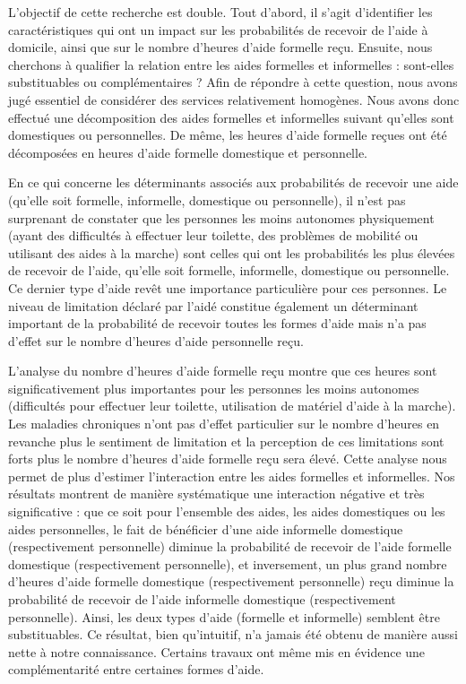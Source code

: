 \begin{Article}
\begin{refsection}[Bonnal]
L'objectif de cette recherche est double. Tout d'abord, il s'agit d'identifier les caractéristiques qui ont un impact sur les probabilités de recevoir de l'aide à domicile, ainsi que sur le nombre d'heures d'aide formelle reçu. Ensuite, nous cherchons à qualifier la relation entre les aides formelles et informelles : sont-elles substituables ou complémentaires ? Afin de répondre à cette question, nous avons jugé essentiel de considérer des services relativement homogènes. Nous avons donc effectué une décomposition des aides formelles et informelles suivant qu'elles sont domestiques ou personnelles. De même, les heures d'aide formelle reçues ont été décomposées en heures d'aide formelle domestique et personnelle.

En ce qui concerne les déterminants associés aux probabilités de recevoir une aide (qu'elle soit formelle, informelle, domestique ou personnelle), il n'est pas surprenant de constater que les personnes les moins autonomes physiquement (ayant des difficultés à effectuer leur toilette, des problèmes de mobilité ou utilisant des aides à la marche) sont celles qui ont les probabilités les plus élevées de recevoir de l'aide, qu'elle soit formelle, informelle, domestique ou personnelle. Ce dernier type d'aide revêt une importance particulière pour ces personnes. Le niveau de limitation déclaré par l'aidé constitue également un déterminant important de la probabilité de recevoir toutes les formes d'aide mais n'a pas d'effet sur le nombre d'heures d'aide personnelle reçu.

L’analyse du nombre d’heures d’aide formelle reçu montre que ces heures sont significativement plus importantes pour les personnes les moins autonomes (difficultés pour effectuer leur toilette, utilisation de matériel d’aide à la marche). Les maladies chroniques n’ont pas d’effet particulier sur le nombre d’heures en revanche plus le sentiment de limitation et la perception de ces limitations sont forts plus le nombre d’heures d’aide formelle reçu sera élevé. Cette analyse nous permet de plus d'estimer l'interaction entre les aides formelles et informelles. Nos résultats montrent de manière systématique une interaction négative et très significative : que ce soit pour l'ensemble des aides, les aides domestiques ou les aides personnelles, le fait de bénéficier d'une aide informelle domestique (respectivement personnelle) diminue la probabilité de recevoir de l'aide formelle domestique (respectivement personnelle), et inversement, un plus grand nombre d'heures d'aide formelle domestique (respectivement personnelle) reçu diminue la probabilité de recevoir de l'aide informelle domestique (respectivement personnelle). Ainsi, les deux types d'aide (formelle et informelle) semblent être substituables. Ce résultat, bien qu'intuitif, n'a jamais été obtenu de manière aussi nette à notre connaissance. Certains travaux ont même mis en évidence une complémentarité entre certaines formes d'aide.


\end{refsection}
\end{Article}
